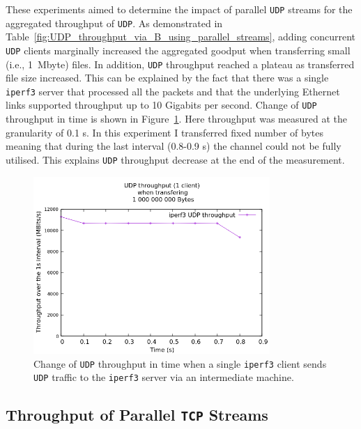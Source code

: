 \documentclass[12pt,a4paper,twoside,openright]{report}
\begin{document}
These experiments aimed to determine the impact of parallel \texttt{UDP} streams for the aggregated throughput of \texttt{UDP}.
As demonstrated in Table~\ref{fig:UDP_throughput_via_B_using_parallel_streams}, adding concurrent \texttt{UDP} clients marginally increased the aggregated goodput when transferring small (i.e., 1~Mbyte) files.
In addition, \texttt{UDP} throughput reached a plateau as transferred file size increased.
This can be explained by the fact that there was a single \texttt{iperf3} server that processed all the packets and that the underlying Ethernet links supported throughput up to 10 Gigabits per second.
Change of \texttt{UDP} throughput in time is shown in Figure~\ref{fig:UDP_throughput_in_time}.
Here throughput was measured at the granularity of 0.1 s.
In this experiment I transferred fixed number of bytes meaning that during the last interval (0.8-0.9 s) the channel could not be fully utilised.
This explains \texttt{UDP} throughput decrease at the end of the measurement. 


    \begin{figure}[H]
    \centering
    \includegraphics[width=0.8\textwidth]{figs/UDP_throughput_in_time.png}
    \caption[Change of \texttt{UDP} throughput in time when a single \texttt{iperf3} client sends \texttt{UDP} traffic to the \texttt{iperf3} server via an intermediate machine]{Change of \texttt{UDP} throughput in time when a single \texttt{iperf3} client sends \texttt{UDP} traffic to the \texttt{iperf3} server via an intermediate machine.}
    \label{fig:UDP_throughput_in_time}
    \end{figure}

\subsection{Throughput of Parallel \texttt{TCP} Streams}
\end{document}
